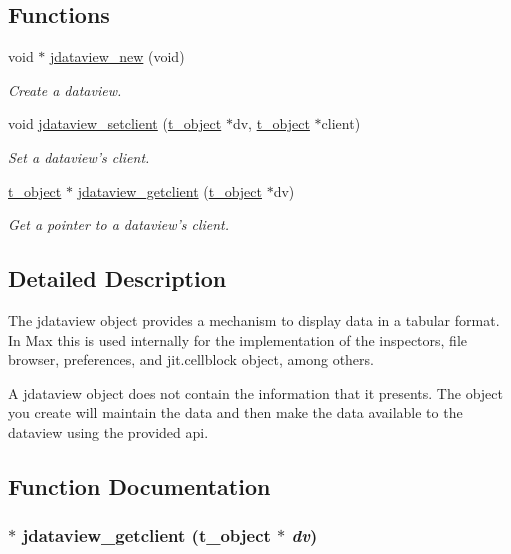 \subsection*{Functions}
\begin{DoxyCompactItemize}
\item 
void $\ast$ \hyperlink{group__jdataview_gade6216b46327a12840074dae041c7060}{jdataview\_\-new} (void)
\begin{DoxyCompactList}\small\item\em Create a dataview. \item\end{DoxyCompactList}\item 
void \hyperlink{group__jdataview_ga830dcb9370db2643336d5a0fe91fae7e}{jdataview\_\-setclient} (\hyperlink{structt__object}{t\_\-object} $\ast$dv, \hyperlink{structt__object}{t\_\-object} $\ast$client)
\begin{DoxyCompactList}\small\item\em Set a dataview's client. \item\end{DoxyCompactList}\item 
\hyperlink{structt__object}{t\_\-object} $\ast$ \hyperlink{group__jdataview_gac7cd79780700da15849455a10e5e72b4}{jdataview\_\-getclient} (\hyperlink{structt__object}{t\_\-object} $\ast$dv)
\begin{DoxyCompactList}\small\item\em Get a pointer to a dataview's client. \item\end{DoxyCompactList}\end{DoxyCompactItemize}


\subsection{Detailed Description}
The jdataview object provides a mechanism to display data in a tabular format. In Max this is used internally for the implementation of the inspectors, file browser, preferences, and jit.cellblock object, among others.

A jdataview object does not contain the information that it presents. The object you create will maintain the data and then make the data available to the dataview using the provided api. 

\subsection{Function Documentation}
\hypertarget{group__jdataview_gac7cd79780700da15849455a10e5e72b4}{
\subsubsection[{jdataview\_\-getclient}]{$\ast$ jdataview\_\-getclient ({\bf t\_\-object} $\ast$ {\em dv})}}
\label{group__jdataview_gac7cd79780700da15849455a10e5e72b4}


